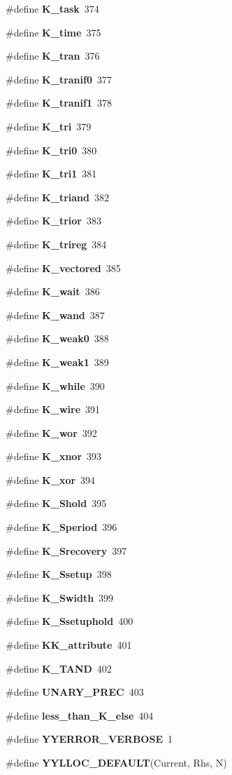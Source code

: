 \begin{CompactItemize}
\#define {\bf K\_\-task}\ 374
\item 
\#define {\bf K\_\-time}\ 375
\item 
\#define {\bf K\_\-tran}\ 376
\item 
\#define {\bf K\_\-tranif0}\ 377
\item 
\#define {\bf K\_\-tranif1}\ 378
\item 
\#define {\bf K\_\-tri}\ 379
\item 
\#define {\bf K\_\-tri0}\ 380
\item 
\#define {\bf K\_\-tri1}\ 381
\item 
\#define {\bf K\_\-triand}\ 382
\item 
\#define {\bf K\_\-trior}\ 383
\item 
\#define {\bf K\_\-trireg}\ 384
\item 
\#define {\bf K\_\-vectored}\ 385
\item 
\#define {\bf K\_\-wait}\ 386
\item 
\#define {\bf K\_\-wand}\ 387
\item 
\#define {\bf K\_\-weak0}\ 388
\item 
\#define {\bf K\_\-weak1}\ 389
\item 
\#define {\bf K\_\-while}\ 390
\item 
\#define {\bf K\_\-wire}\ 391
\item 
\#define {\bf K\_\-wor}\ 392
\item 
\#define {\bf K\_\-xnor}\ 393
\item 
\#define {\bf K\_\-xor}\ 394
\item 
\#define {\bf K\_\-Shold}\ 395
\item 
\#define {\bf K\_\-Speriod}\ 396
\item 
\#define {\bf K\_\-Srecovery}\ 397
\item 
\#define {\bf K\_\-Ssetup}\ 398
\item 
\#define {\bf K\_\-Swidth}\ 399
\item 
\#define {\bf K\_\-Ssetuphold}\ 400
\item 
\#define {\bf KK\_\-attribute}\ 401
\item 
\#define {\bf K\_\-TAND}\ 402
\item 
\#define {\bf UNARY\_\-PREC}\ 403
\item 
\#define {\bf less\_\-than\_\-K\_\-else}\ 404
\item 
\#define {\bf YYERROR\_\-VERBOSE}\ 1
\item 
\#define {\bf YYLLOC\_\-DEFAULT}(Current, Rhs, N)
\item 

\end{CompactItemize}
